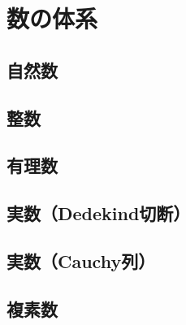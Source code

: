 \chapter{数の体系}
\label{chp:number}
%
 \section{自然数}
 \label{sec:natural}
%
 \section{整数}
 \label{sec:int}
%
 \section{有理数}
 \label{sec:yuuri}
%
 \section{実数（\textrm{Dedekind}切断）}
 \label{sec:dedekind}
%
 \section{実数（\textrm{Cauchy}列）}
 \label{sec:cantor}
%
 \section{複素数}
 \label{sec:complex}
%

 
